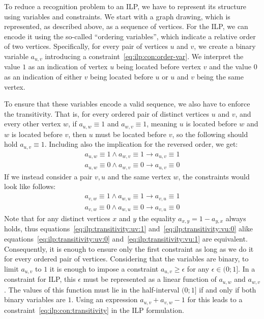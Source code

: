 To reduce a recognition problem to an ILP, we have to represent its structure using variables and constraints. We start with a graph drawing, which is represented, as described above, as a sequence of vertices. For the ILP, we can encode it using the so-called ``ordering variables'', which indicate a relative order of two vertices. Specifically, for every pair of vertices \(u\) and \(v\), we create a binary variable \(a_{u, v}\) introducing a constraint~\eqref{eq:ilp:con:order-var}. We interpret the value \(1\) as an indication of vertex \(u\) being located before vertex \(v\) and the value \(0\) as an indication of either \(v\) being located before \(u\) or \(u\) and \(v\) being the same vertex.

To ensure that these variables encode a valid sequence, we also have to enforce the transitivity. That is, for every ordered pair of distinct vertices \(u\) and \(v\), and every other vertex \(w\), if \(a_{u, w} \equiv 1\) and \(a_{w, v} \equiv 1\), meaning \(u\) is located before \(w\) and \(w\) is located before \(v\), then \(u\) must be located before \(v\), so the following should hold \(a_{u, v} \equiv 1\). Including also the implication for the reversed order, we get:
\begin{align}
    a_{u, w} \equiv 1 \land a_{w, v} \equiv 1 \longrightarrow a_{u, v} \equiv 1 \label{eq:ilp:transitivity:uv:1}\\
    a_{u, w} \equiv 0 \land a_{w, v} \equiv 0 \longrightarrow a_{u, v} \equiv 0 \label{eq:ilp:transitivity:uv:0}
\end{align}
If we instead consider a pair \(v, u\) and the same vertex \(w\),  the constraints would look like follows:
\begin{align}
    a_{v, w} \equiv 1 \land a_{w, u} \equiv 1 \longrightarrow a_{v, u} \equiv 1 \label{eq:ilp:transitivity:vu:1} \\
    a_{v, w} \equiv 0 \land a_{w, u} \equiv 0 \longrightarrow a_{v, u} \equiv 0 \label{eq:ilp:transitivity:vu:0}
\end{align}
Note that for any distinct vertices \(x\) and \(y\) the equality \(a_{x, y} = 1 - a_{y, x}\) always holds, thus equations~\eqref{eq:ilp:transitivity:uv:1} and~\eqref{eq:ilp:transitivity:vu:0} alike equations~\eqref{eq:ilp:transitivity:uv:0} and~\eqref{eq:ilp:transitivity:vu:1} are equivalent. Consequently, it is enough to ensure only the first constraint as long as we do it for every ordered pair of vertices. Considering that the variables are binary, to limit \(a_{u, v}\) to \(1\) it is enough to impose a constraint \(a_{u, v} \geqslant \epsilon\) for any \(\epsilon \in (0;1]\). In a constraint for ILP, this \(\epsilon\) must be represented as a linear function of \(a_{u, w}\) and \(a_{w, v}\). The values of this function must lie in the half-interval \((0;1]\) if and only if both binary variables are \(1\). Using an expression \(a_{u, v} + a_{v, w} - 1\) for this leads to a constraint~\eqref{eq:ilp:con:transitivity} in the ILP formulation.


